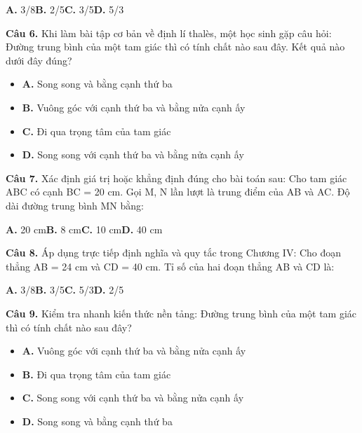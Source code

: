 \documentclass[11pt,a4paper]{article}
\begin{document}
\hspace*{1.5em}\textbf{A.} 3/8\quad\quad \textbf{B.} 2/5\quad\quad \textbf{C.} 3/5\quad\quad \textbf{D.} 5/3\par\vspace{2pt}
\textbf{\color{primary} Câu 6.} Khi làm bài tập cơ bản về định lí thalès, một học sinh gặp câu hỏi: Đường trung bình của một tam giác thì có tính chất nào sau đây. Kết quả nào dưới đây đúng?\par
\begin{itemize}\setlength{\itemsep}{1pt}\setlength{\parskip}{0pt}
  \item[] \textbf{A.} Song song và bằng cạnh thứ ba
  \item[] \textbf{B.} Vuông góc với cạnh thứ ba và bằng nửa cạnh ấy
  \item[] \textbf{C.} Đi qua trọng tâm của tam giác
  \item[] \textbf{D.} Song song với cạnh thứ ba và bằng nửa cạnh ấy
\end{itemize}\vspace{2pt}
\textbf{\color{primary} Câu 7.} Xác định giá trị hoặc khẳng định đúng cho bài toán sau: Cho tam giác ABC có cạnh BC = 20 cm. Gọi M, N lần lượt là trung điểm của AB và AC. Độ dài đường trung bình MN bằng:\par
\hspace*{1.5em}\textbf{A.} 20 cm\quad\quad \textbf{B.} 8 cm\quad\quad \textbf{C.} 10 cm\quad\quad \textbf{D.} 40 cm\par\vspace{2pt}
\textbf{\color{primary} Câu 8.} Áp dụng trực tiếp định nghĩa và quy tắc trong Chương IV: Cho đoạn thẳng AB = 24 cm và CD = 40 cm. Tỉ số của hai đoạn thẳng AB và CD là:\par
\hspace*{1.5em}\textbf{A.} 3/8\quad\quad \textbf{B.} 3/5\quad\quad \textbf{C.} 5/3\quad\quad \textbf{D.} 2/5\par\vspace{2pt}
\textbf{\color{primary} Câu 9.} Kiểm tra nhanh kiến thức nền tảng: Đường trung bình của một tam giác thì có tính chất nào sau đây?\par
\begin{itemize}\setlength{\itemsep}{1pt}\setlength{\parskip}{0pt}
  \item[] \textbf{A.} Vuông góc với cạnh thứ ba và bằng nửa cạnh ấy
  \item[] \textbf{B.} Đi qua trọng tâm của tam giác
  \item[] \textbf{C.} Song song với cạnh thứ ba và bằng nửa cạnh ấy
  \item[] \textbf{D.} Song song và bằng cạnh thứ ba
\end{itemize}\vspace{2pt}
\end{document}
